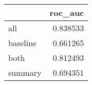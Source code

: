 \begin{tabular}{lr}
\toprule
{} &   roc\_auc \\
\midrule
all      &  0.838533 \\
baseline &  0.661265 \\
both     &  0.812493 \\
summary  &  0.694351 \\
\bottomrule
\end{tabular}

